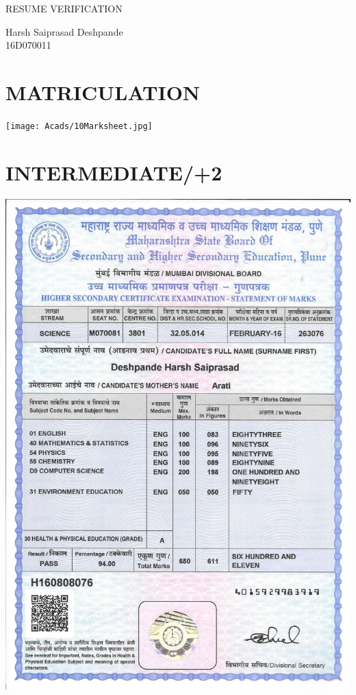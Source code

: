 \documentclass{article}
\begin{document}
	\begin{titlepage}
		\vspace*{\fill}
		\begin{center}
			\LARGE RESUME VERIFICATION\\
		\end{center}
		\begin{center}
			\Large Harsh Saiprasad Deshpande \\
			\Large 16D070011
			
		\end{center}
		\vspace*{\fill}
	\end{titlepage}
	\tableofcontents
	\newpage
	\section{MATRICULATION}
		\texttt{[image: Acads/10Marksheet.jpg]}{\centering}
	\section{INTERMEDIATE/+2}
		\includegraphics[width = 1\textwidth]{Acads/12Marksheet.jpg}{\centering}
\end{document}
